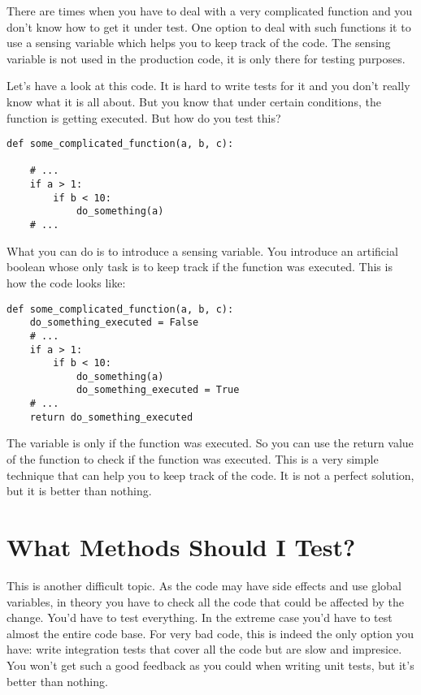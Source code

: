 There are times when you have to deal with a very complicated function and you don't know how to get it under test. One option to deal with such functions it to use a sensing variable which helps you to keep track of the code. The sensing variable is not used in the production code, it is only there for testing purposes.

Let's have a look at this code. It is hard to write tests for it and you don't really know what it is all about. But you know that under certain conditions, the function  is getting executed. But how do you test this?

\begin{programcode}{}
\begin{verbatim}
def some_complicated_function(a, b, c):

    # ...
    if a > 1:
        if b < 10:
            do_something(a)
    # ...
\end{verbatim}
\end{programcode}

What you can do is to introduce a sensing variable. You introduce an artificial boolean whose only task is to keep track if the function  was executed. This is how the code looks like:

\begin{programcode}{}
\begin{verbatim}
def some_complicated_function(a, b, c):
    do_something_executed = False
    # ...
    if a > 1:
        if b < 10:
            do_something(a)
            do_something_executed = True
    # ...
    return do_something_executed
\end{verbatim}
\end{programcode}

The variable  is only  if the function \newline {} was executed. So you can use the return value of the function to check if the function was executed. This is a very simple technique that can help you to keep track of the code. It is not a perfect solution, but it is better than nothing.

\section{What Methods Should I Test?}

This is another difficult topic. As the code may have side effects and use global variables, in theory you have to check all the code that could be affected by the change. You'd have to test everything. In the extreme case you'd have to test almost the entire code base. For very bad code, this is indeed the only option you have: write integration tests that cover all the code but are slow and impresice. You won't get such a good feedback as you could when writing unit tests, but it's better than nothing.

